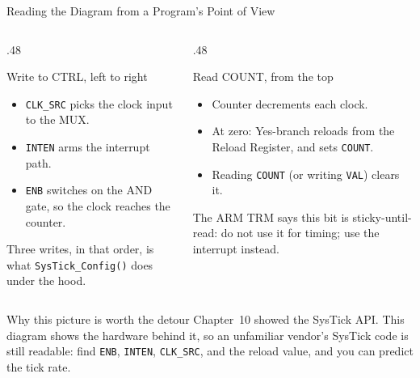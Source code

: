\documentclass[9pt,aspectratio=169,xcolor=table]{beamer}
\begin{document}
\begin{frame}{Reading the Diagram from a Program's Point of View}
    \begin{columns}[T]
    \begin{column}{.48\textwidth}
        \begin{block}{Write to CTRL, left to right}
            {\small
            \begin{itemize}\itemsep1pt
                \item \texttt{CLK\_SRC} picks the clock input to the MUX.
                \item \texttt{INTEN} arms the interrupt path.
                \item \texttt{ENB} switches on the AND gate, so the clock
                      reaches the counter.
            \end{itemize}}
        \end{block}

        \vspace{2mm}
        {\small Three writes, in that order, is what \texttt{SysTick\_Config()}
        does under the hood.}
    \end{column}
    \begin{column}{.48\textwidth}
        \begin{block}{Read COUNT, from the top}
            {\small
            \begin{itemize}\itemsep1pt
                \item Counter decrements each clock.
                \item At zero: Yes-branch reloads from the Reload Register,
                      and sets \texttt{COUNT}.
                \item Reading \texttt{COUNT} (or writing \texttt{VAL})
                      clears it.
            \end{itemize}}
        \end{block}

        \vspace{2mm}
        {\small The ARM TRM says this bit is \alert{sticky-until-read}: do
        not use it for timing; use the interrupt instead.}
    \end{column}
    \end{columns}

    \vspace{3mm}
    \begin{block}{Why this picture is worth the detour}
        {\small Chapter~10 showed the SysTick API. This diagram shows the
        hardware behind it, so an unfamiliar vendor's SysTick code is
        still readable: find \texttt{ENB}, \texttt{INTEN},
        \texttt{CLK\_SRC}, and the reload value, and you can predict the
        tick rate.}
    \end{block}
\end{frame}
\end{document}
